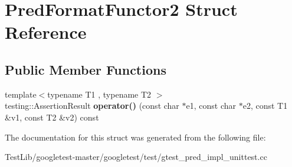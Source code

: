\hypertarget{structPredFormatFunctor2}{}\section{Pred\+Format\+Functor2 Struct Reference}
\label{structPredFormatFunctor2}
\subsection*{Public Member Functions}
\begin{DoxyCompactItemize}
\item 
\mbox{\label{structPredFormatFunctor2_a0169e0105e15d5c63bece2a20646b22b}} 
{\footnotesize template$<$typename T1 , typename T2 $>$ }\\testing\+::\+Assertion\+Result {\bfseries operator()} (const char $\ast$e1, const char $\ast$e2, const T1 \&v1, const T2 \&v2) const
\end{DoxyCompactItemize}


The documentation for this struct was generated from the following file\+:\begin{DoxyCompactItemize}
\item 
Test\+Lib/googletest-\/master/googletest/test/gtest\+\_\+pred\+\_\+impl\+\_\+unittest.\+cc\end{DoxyCompactItemize}
